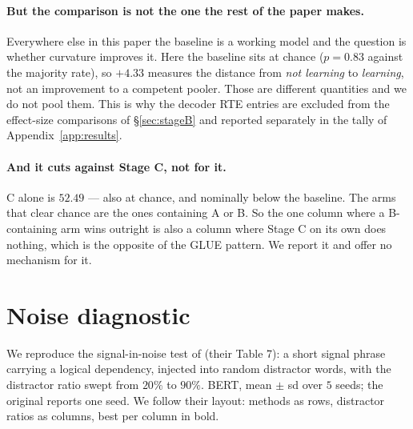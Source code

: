 \documentclass{article}
\begin{document}
\paragraph{But the comparison is not the one the rest of the paper makes.}
Everywhere else in this paper the baseline is a working model and the question
is whether curvature improves it. Here the baseline sits at chance
($p=0.83$ against the majority rate), so $+4.33$ measures the distance from
\emph{not learning} to \emph{learning}, not an improvement to a competent
pooler. Those are different quantities and we do not pool them. This is why the
decoder RTE entries are excluded from the effect-size comparisons of
\S\ref{sec:stageB} and reported separately in the tally of
Appendix~\ref{app:results}.

\paragraph{And it cuts against Stage C, not for it.} C alone is $52.49$ ---
also at chance, and nominally below the baseline. The arms that clear chance
are the ones containing A or B. So the one column where a B-containing arm wins
outright is also a column where Stage C on its own does nothing, which is the
opposite of the GLUE pattern. We report it and offer no mechanism for it.

\section{Noise diagnostic}
\label{app:stress}

We reproduce the signal-in-noise test of \citet{mantri2026glot} (their Table 7):
a short signal phrase carrying a logical dependency, injected into random
distractor words, with the distractor ratio swept from $20\%$ to $90\%$. BERT,
mean $\pm$ sd over $5$ seeds; the original reports one seed. We follow their
layout: methods as rows, distractor ratios as columns, best per column in bold.
\end{document}
